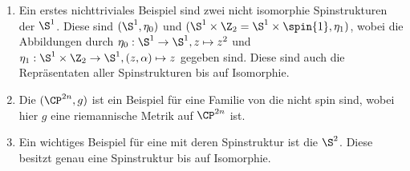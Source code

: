 \begin{Bsp}
\begin{enumerate}[(1)]
  \item Ein erstes nichttriviales Beispiel sind zwei nicht isomorphie
    Spinstrukturen der $\S^1$. Diese sind $(\S^1 , \eta_0)$ und
    $(\S^1 \times \Z_2 = \S^1 \times \spin{1} , \eta_1)$, wobei die
    Abbildungen durch $\eta_0 : \S^1 \rightarrow \S^1 , z \mapsto z^2$
    und
    $\eta_1 : \S^1 \times \Z_2 \rightarrow \S^1 , (z,\alpha) \mapsto
    z$
    gegeben sind. Diese sind auch die Repräsentaten aller
    Spinstrukturen bis auf Isomorphie.  
  \item Die $(\CP^{2n},g)$ ist ein Beispiel für eine Familie von
    \RMFen die nicht spin sind, wobei hier $g$ eine riemannische
    Metrik auf $\CP^{2n}$ ist.  
  \item Ein wichtiges Beispiel für eine \RMF mit deren Spinstruktur
    ist die $\S^2$. Diese besitzt genau eine Spinstruktur bis auf
    Isomorphie.   
	\end{enumerate}
\end{Bsp}






